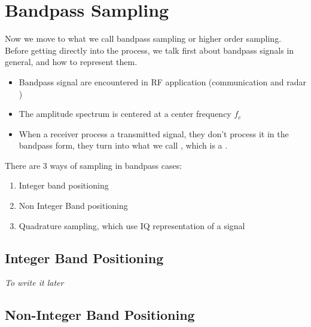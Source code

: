 



\chapter{Bandpass Sampling}

Now we move to what we call bandpass sampling or higher order sampling. Before getting directly into the process, we talk first about bandpass signals in general, and how to represent them.

\begin{itemize}

\item Bandpass signal are encountered in RF application (communication and radar )


\item The amplitude spectrum is centered at a center frequency $f_c$

\item When a receiver process a transmitted signal, they don't process it in the bandpass form, they turn into what we call , which is a .

\end{itemize}

There are 3 ways of sampling in bandpass cases:

\begin{enumerate}
    \item Integer band positioning
    
    \item Non Integer Band positioning
    
    \item Quadrature sampling, which use IQ representation of a signal
    
\end{enumerate}


\section{Integer Band Positioning}


\textit{To write it later}


\section{Non-Integer Band Positioning}

